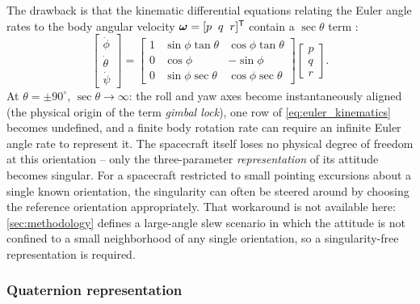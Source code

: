 The drawback is that the kinematic differential equations relating the Euler angle rates to the body angular velocity $\bm{\omega} = [p\;\; q\;\; r]^{\mathsf{T}}$ contain a $\sec\theta$ term \cite{wie2008, markley2014}:
\begin{equation}
    \begin{bmatrix} \dot\phi \\ \dot\theta \\ \dot\psi \end{bmatrix}
    =
    \begin{bmatrix}
        1 & \sin\phi\tan\theta & \cos\phi\tan\theta \\
        0 & \cos\phi & -\sin\phi \\
        0 & \sin\phi\sec\theta & \cos\phi\sec\theta
    \end{bmatrix}
    \begin{bmatrix} p \\ q \\ r \end{bmatrix}.
    \label{eq:euler_kinematics}
\end{equation}
At $\theta = \pm 90^\circ$, $\sec\theta \to \infty$: the roll and yaw axes become instantaneously aligned (the physical origin of the term \emph{gimbal lock}), one row of \cref{eq:euler_kinematics} becomes undefined, and a finite body rotation rate can require an infinite Euler angle rate to represent it. The spacecraft itself loses no physical degree of freedom at this orientation -- only the three-parameter \emph{representation} of its attitude becomes singular. For a spacecraft restricted to small pointing excursions about a single known orientation, the singularity can often be steered around by choosing the reference orientation appropriately. That workaround is not available here: \cref{sec:methodology} defines a large-angle slew scenario in which the attitude is not confined to a small neighborhood of any single orientation, so a singularity-free representation is required.

\subsubsection{Quaternion representation}

